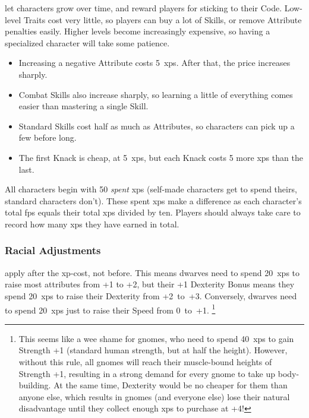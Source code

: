 \begin{multicols}{2}

\noindent
{} let characters grow over time, and reward players for sticking to their Code.
Low-level Traits cost very little, so players can buy a lot of Skills, or remove Attribute penalties easily.
Higher levels become increasingly expensive, so having a specialized character will take some patience.

\begin{itemize}
  \item
  Increasing a negative Attribute costs 5~\glspl{xp}.
  After that, the price increases sharply.
  \item
  Combat Skills also increase sharply, so learning a little of everything comes easier than mastering a single Skill.
  \item
  Standard Skills cost half as much as Attributes, so characters can pick up a few before long.
  \item
  The first Knack is cheap, at 5~\glspl{xp}, but each Knack costs 5 more \glspl{xp} than the last.
\end{itemize}

All characters begin with 50 \textit{spent} \glspl{xp}
(self-made characters get to spend theirs, standard characters don't).
These spent \glspl{xp} make a difference as each character's total \glspl{fp} equals their total \glspl{xp} divided by ten.
Players should always take care to record how many \glspl{xp} they have earned in total.

\subsubsection{Racial Adjustments}
apply after the \gls{xp}-cost, not before.
This means dwarves need to spend 20~\glspl{xp} to raise most \glspl{attribute} from +1 to +2, but their +1 Dexterity Bonus means they spend 20~\glspl{xp} to raise their Dexterity from +2~to~+3.
Conversely, dwarves need to spend 20~\glspl{xp} just to raise their Speed from 0~to~+1.%
\footnote{This seems like a wee shame for gnomes, who need to spend 40~\glspl{xp} to gain Strength +1 (standard human strength, but at half the height).
However, without this rule, all gnomes will reach their muscle-bound heights of Strength +1, resulting in a strong demand for every gnome to take up body-building.
At the same time, Dexterity would be no cheaper for them than anyone else, which results in gnomes (and everyone else) lose their natural disadvantage until they collect enough \glspl{xp} to purchase  at +4!}


\end{multicols}
